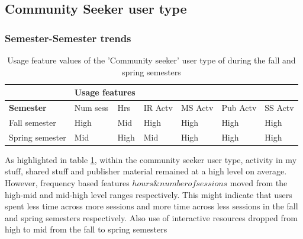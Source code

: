 \documentclass{acm_proc_article-sp}
\begin{document}
\subsection{Community Seeker user type}

\subsubsection{Semester-Semester trends}

\begin{table}
\caption{Usage feature values of the 'Community seeker' user type of during the fall and  spring semesters}
\label{cluster2month}
\begin{tabular}{|p{1.5cm}|p{0.6cm}|p{0.6cm}|p{0.6cm}|p{0.6cm}|p{0.8cm}|p{0.8cm}|}
& \multicolumn{2}{r}{\textbf{Usage features}}  \\ \hline
 \textbf{Semester} 
 & Num sess & Hrs & IR Actv & MS Actv & Pub Actv & SS Actv \\ \hline
Fall  semester & High & Mid  & High & High & High & High \\ \hline
Spring semester & Mid & High  & Mid & High & High & High \\ \hline
\end{tabular}
\end{table}

As highlighted in table \ref{cluster2month}, within the community seeker user type, activity in my stuff, shared stuff and publisher material remained at a high level on average. However, frequency based features \(hours \& number of sessions\) moved from the high-mid and mid-high level ranges respectively. This might indicate that users  spent less time across more sessions and more time across less sessions in the fall and spring semesters respectively. Also use of interactive resources dropped from high to mid from the fall to spring semesters
\end{document}
